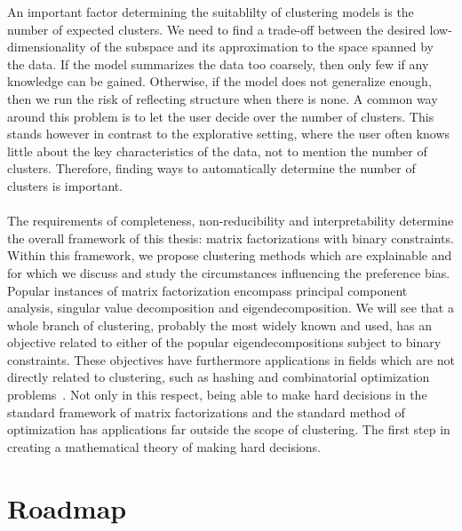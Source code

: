 An important factor determining the suitablilty of clustering models is the number of expected clusters. We need to find a trade-off between the desired low-dimensionality of the subspace and its approximation to the space spanned by the data. If the model summarizes the data too coarsely, then only few if any knowledge can be gained. Otherwise, if the model does not generalize enough, then we run the risk of reflecting structure when there is none. A common way around this problem is to let the user decide over the number of clusters. This stands however in contrast to the explorative setting, where the user often knows little about the key characteristics of the data, not to mention the number of clusters. Therefore, finding ways to automatically determine the number of clusters is important.

\paragraph{}The requirements of completeness, non-reducibility and interpretability determine the overall framework of this thesis: matrix factorizations with binary constraints. Within this framework, we propose clustering methods which are explainable and for which we discuss and study the circumstances influencing the preference bias.  Popular instances of matrix factorization encompass principal component analysis, singular value decomposition and eigendecomposition. We will see that a whole branch of clustering, probably the most widely known and used, has an objective related to either of the popular eigendecompositions subject to binary constraints. These objectives have furthermore applications in fields which are not directly related to clustering, such as hashing and combinatorial optimization problems~\citep{ding2008nonnegative,mukherjee2015nmf}. Not only in this respect, being able to make hard decisions in the standard framework of matrix factorizations and the standard method of optimization has applications far outside the scope of clustering. The first step in creating a mathematical theory of making hard decisions.
\section{Roadmap}
